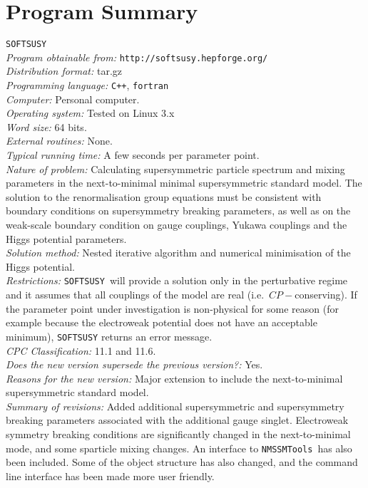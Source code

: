 \documentclass[final,3p,times,pdflatex]{elsarticle}
\def\SOFTSUSY{{\tt SOFTSUSY}}
\def\NMSSMTools{{\tt NMSSMTools}}
\begin{document}
\section{Program Summary}
 \SOFTSUSY{}\\
{\em Program obtainable   from:} {\tt http://softsusy.hepforge.org/}\\
{\em Distribution format:}\/ tar.gz\\
{\em Programming language:} {\tt C++}, {\tt fortran}\\
{\em Computer:}\/ Personal computer.\\
{\em Operating system:}\/ Tested on Linux 3.x\\
{\em Word size:}\/ 64 bits.\\
{\em External routines:}\/ None.\\
{\em Typical running time:}\/ A few seconds per parameter point.\\
{\em Nature of problem:}\/ Calculating supersymmetric particle spectrum and
mixing parameters in the next-to-minimal minimal supersymmetric standard
model. The solution to the renormalisation group equations must be consistent
with boundary conditions on supersymmetry breaking parameters, as
well as on the weak-scale boundary condition on gauge 
couplings, Yukawa couplings and the Higgs potential parameters.\\
{\em Solution method:}\/ Nested iterative algorithm and numerical minimisation
of the Higgs potential. \\
{\em Restrictions:} \SOFTSUSY~will provide a solution only in the
perturbative regime and it
assumes that all couplings of the model are real
(i.e.\ $CP-$conserving). If the parameter point under investigation is
non-physical for some reason (for example because the electroweak potential
does not have an acceptable minimum), \SOFTSUSY{} returns an error message.\\
{\em CPC Classification:} 11.1 and 11.6.\\
{\em Does the new version supersede the previous version?:} Yes.\\
{\em Reasons for the new version:} Major extension to include the
next-to-minimal supersymmetric standard model.\\
{\em Summary of revisions:} Added additional supersymmetric and supersymmetry
breaking parameters associated with the additional gauge singlet. Electroweak
symmetry breaking conditions are significantly changed in the next-to-minimal
mode, and some sparticle mixing changes. An interface to \NMSSMTools~has also
been included. Some of the object structure has also changed, and the command
line interface has been made more user friendly.
\end{document}
